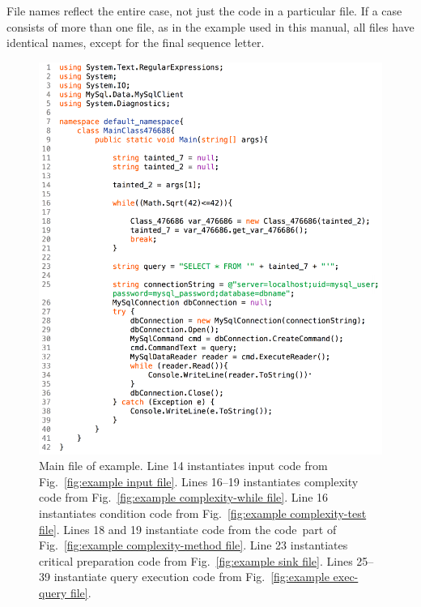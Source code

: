 File names reflect the entire case, not just the code in a
particular file.  If a case consists of more than one file, as in the
example used in this manual, all files have
identical names, except for the final sequence letter.

\begin{figure}[tbp]
  \includegraphics[width=\linewidth]{fig_example_code1.png}
  \caption{Main file of example. Line 14 instantiates input code from 
    Fig.~\ref{fig:example input file}. Lines 16--19 instantiates complexity code from 
    Fig.~\ref{fig:example complexity-while file}. Line 16 instantiates condition code from
    Fig.~\ref{fig:example complexity-test file}.  Lines 18 and 19 instantiate code from the
    \texlangle code\texrangle\  part of Fig.~\ref{fig:example complexity-method file}.
    Line 23 instantiates critical preparation code from Fig.~\ref{fig:example sink file}.
    Lines 25--39 instantiate query execution code from Fig.~\ref{fig:example exec-query file}.
  }
  \label{fig:example main file}
\end{figure}

